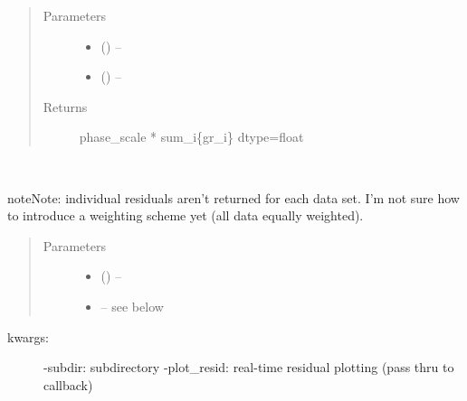 \documentclass[letterpaper,10pt,english]{sphinxmanual}
\begin{document}
\begin{fulllineitems}
\begin{fulllineitems}
\begin{description}
\end{description}
\begin{quote}\begin{description}
\item[{Parameters}] \leavevmode\begin{itemize}
\item {} 
 () -- 

\item {} 
 () -- 

\end{itemize}

\item[{Returns}] \leavevmode
phase\_scale * sum\_i\{gr\_i\} \textbar{} dtype=float

\end{description}\end{quote}

\end{fulllineitems}


\begin{fulllineitems}
\label{\detokenize{rst/pairdistributionfunction:mstack.pairdistributionfunction.PdfRefinement.objective_function}}~
\begin{sphinxadmonition}{note}{Note:}
individual residuals aren't returned for each data set. I'm not
sure how to introduce a weighting scheme yet (all data equally
weighted).
\end{sphinxadmonition}
\begin{quote}\begin{description}
\item[{Parameters}] \leavevmode\begin{itemize}
\item {} 
 () -- 

\item {} 
 -- see below

\end{itemize}

\end{description}\end{quote}
\begin{description}
\item[{kwargs:}] \leavevmode
-subdir: subdirectory
-plot\_resid: real-time residual plotting (pass thru to callback)


\end{description}
\end{fulllineitems}
\end{fulllineitems}
\end{document}
